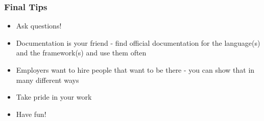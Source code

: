 \documentclass{beamer}
\begin{document}
\begin{frame}\frametitle{Final Tips}
\begin{itemize}
  \item Ask questions!
  \item Documentation is your friend - find official documentation for the
        language(s) and the framework(s) and use them often
  \item Employers want to hire people that want to be there - you can show that
        in many different ways
  \item Take pride in your work
  \item Have fun!
\end{itemize}


\end{frame}
\end{document}
